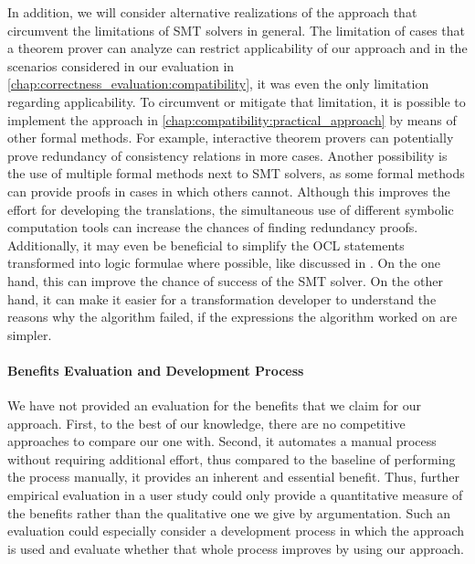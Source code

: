 In addition, we will consider alternative realizations of the approach that circumvent the limitations of \gls{SMT} solvers in general.
The limitation of cases that a theorem prover can analyze can restrict applicability of our approach and in the scenarios considered in our evaluation in \autoref{chap:correctness_evaluation:compatibility}, it was even the only limitation regarding applicability.
To circumvent or mitigate that limitation, it is possible to implement the approach in \autoref{chap:compatibility:practical_approach} by means of other formal methods. 
For example, interactive theorem provers can potentially prove redundancy of consistency relations in more cases. 
Another possibility is the use of multiple formal methods next to \gls{SMT} solvers, as some formal methods can provide proofs in cases in which others cannot.
Although this improves the effort for developing the translations, the simultaneous use of different symbolic computation tools can increase the chances of finding redundancy proofs.
Additionally, it may even be beneficial to simplify the \gls{OCL} statements transformed into logic formulae where possible, like discussed in \textcite{cuadrado2019OclOptimization-SoSym}.
On the one hand, this can improve the chance of success of the \gls{SMT} solver.
On the other hand, it can make it easier for a transformation developer to understand the reasons why the algorithm failed, if the expressions the algorithm worked on are simpler.



\paragraph{Benefits Evaluation and Development Process}
We have not provided an evaluation for the benefits that we claim for our approach.
First, to the best of our knowledge, there are no competitive approaches to compare our one with.
Second, it automates a manual process without requiring additional effort, thus compared to the baseline of performing the process manually, it provides an inherent and essential benefit.
Thus, further empirical evaluation in a user study could only provide a quantitative measure of the benefits rather than the qualitative one we give by argumentation.
Such an evaluation could especially consider a development process in which the approach is used and evaluate whether that whole process improves by using our approach.

